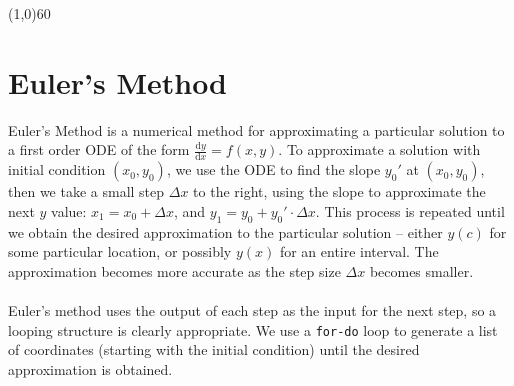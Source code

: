 \documentclass[10.5pt,twoside]{report}
\theoremstyle{definition}
\begin{document}
\line(1,0){60}
\linethickness{0.5mm}
\pagebreak

\section{Euler's Method}\label{Euler's Method}

Euler's Method is a numerical method for approximating a particular solution to a first order ODE of the form $\frac{\mathrm{d}y}{\mathrm{d}x}=f(x,y)$.  To approximate a solution with initial condition $(x_0,y_0)$, we use the ODE to find the slope $y_0'$ at $(x_0,y_0)$, then we take a small step $\Delta x$ to the right, using the slope to approximate the next $y$ value:  $x_1=x_0+\Delta x$, and $y_1=y_0+y_0'\cdot \Delta x$.  This process is repeated until we obtain the desired approximation to the particular solution -- either $y(c)$ for some particular location, or possibly $y(x)$ for an entire interval.  The approximation becomes more accurate as the step size $\Delta x$ becomes smaller.  \\
${}$\\
Euler's method uses the output of each step as the input for the next step, so a looping structure is clearly appropriate.  We use a \verb|for-do| loop to generate a list of coordinates (starting with the initial condition) until the desired approximation is obtained.
\end{document}
